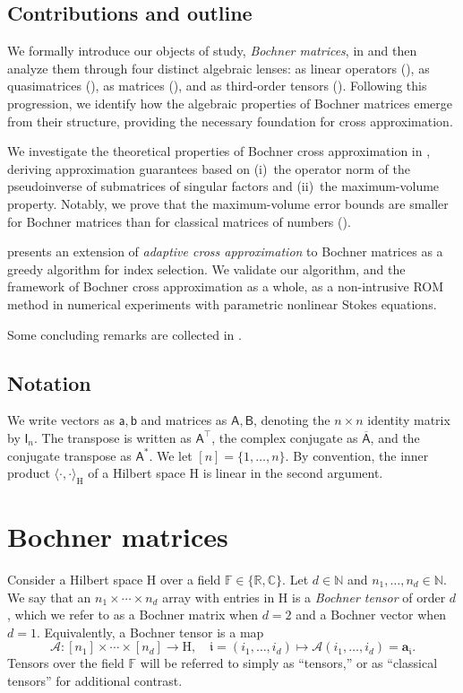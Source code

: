 \documentclass[onefignum,onetabnum]{siamart250211}
\renewenvironment{equation*}{\[}{\]\ignorespacesafterend}
\newcommand{\Clx}{\mathbb{C}}
\newcommand{\Real}{\mathbb{R}}
\newcommand{\F}{\mathbb{F}}
\newcommand{\N}{\mathbb{N}}
\newcommand{\Hilb}{\mathrm{H}}
\newcommand{\Bensor}[1]{\bm{\Tensor{#1}}}
\newcommand{\Tensor}[1]{{\mathscr{#1}}}
\newcommand{\Matrix}[1]{\mathsf{#1}}
\newcommand{\Bentry}[1]{{\bm{#1}}}
\newcommand{\trans}{\intercal}
\newcommand{\mIndex}[1]{\mathfrak{#1}}
\newcommand{\Dotp}[4][]{#1\langle #2, #3 #1\rangle_{\mathrm{#4}}}
\begin{document}
\subsection{Contributions and outline}
We formally introduce our objects of study, \emph{Bochner matrices}, in  and then analyze them through four distinct algebraic lenses: as linear operators (), as quasimatrices (), as matrices (), and as third-order tensors ().
Following this progression, we identify how the algebraic properties of Bochner matrices emerge from their structure, providing the necessary foundation for cross approximation.

We investigate the theoretical properties of Bochner cross approximation in , deriving approximation guarantees based on (i)~the operator norm of the pseudoinverse of submatrices of singular factors and (ii)~the maximum-volume property.
Notably, we prove that the maximum-volume error bounds are smaller for Bochner matrices than for classical matrices of numbers ().

 presents an extension of \emph{adaptive cross approximation} \cite{bebendorf2000approximation, bebendorf2003adaptive} to Bochner matrices as a greedy algorithm for index selection.
We validate our algorithm, and the framework of Bochner cross approximation as a whole, as a non-intrusive ROM method in numerical experiments with parametric nonlinear Stokes equations.

Some concluding remarks are collected in .

\subsection{Notation}
We write vectors as $\Matrix{a,b}$ and matrices as $\Matrix{A,B}$, denoting the $n \times n$ identity matrix by $\Matrix{I}_n$.
The transpose is written as $\Matrix{A}^\trans$, the complex conjugate as $\overline{\Matrix{A}}$, and the conjugate transpose as $\Matrix{A}^\ast$.
We let $[n] = \{ 1, \ldots, n \}$.
By convention, the inner product $\Dotp{\cdot}{\cdot}{\Hilb}$ of a Hilbert space $\Hilb$ is linear in the second argument.
\section{Bochner matrices}
\label{sec:bmx}
Consider a Hilbert space $\Hilb$ over a field $\F \in \{ \Real, \Clx \}$.
Let $d \in \N$ and $n_1, \ldots, n_d \in \N$.
We say that an $n_1 \times \cdots \times n_d$ array with entries in $\Hilb$ is a \emph{Bochner tensor} of order $d$, which we refer to as a Bochner matrix when $d = 2$ and a Bochner vector when $d = 1$.
Equivalently, a Bochner tensor is a map
\begin{equation*}
    \Bensor{A} : [n_1] \times \cdots \times [n_d] \to \Hilb, \quad \mIndex{i} = (i_1, \ldots, i_d) \mapsto \Bensor{A}(i_1, \ldots, i_d) = \Bentry{a}_{\mIndex{i}}.
\end{equation*}
Tensors over the field $\F$ will be referred to simply as ``tensors,'' or as ``classical tensors'' for additional contrast.
\end{document}
